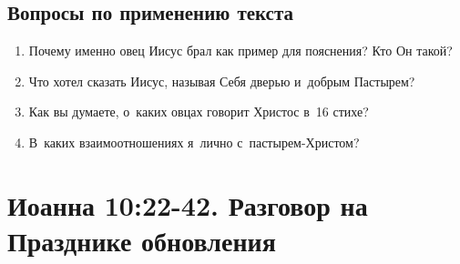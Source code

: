 \documentclass[a4paper,12pt]{article}
\begin{document}
\subsection*{Вопросы по применению текста} 
\begin{enumerate}
    \item Почему именно овец Иисус брал как пример для пояснения? Кто Он такой? 
    
    \myline
    
    \myline
    \item Что хотел сказать Иисус, называя Себя дверью и~добрым Пастырем? 
    
    \myline
    
    \myline
    \item Как вы думаете, о~каких овцах говорит Христос в~16 стихе? 
    
    \myline
    
    \myline
    \item В~каких взаимоотношениях я~лично с~пастырем-Христом? 
    
    \myline
    
    \myline
\end{enumerate}


\section{Иоанна 10:22-42. Разговор на Празднике обновления}
\end{document}
